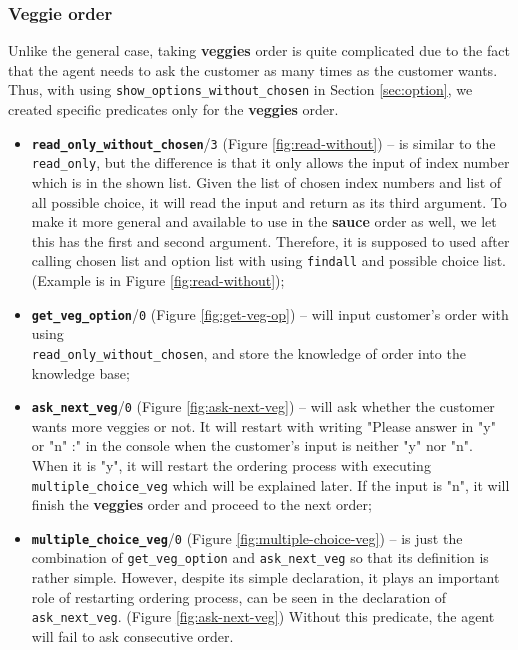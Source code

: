\documentclass[12pt,a4paper]{article}
\newcommand{\varname}[1]{\texttt{#1}}
\newcommand{\varnamebf}[1]{\textbf{\texttt{#1}}}
\newcommand{\predprot}[2]{{\color{MidnightBlue}\varnamebf{#1}}/{\color{Mulberry}\varname{#2}}}
\newcommand{\predname}[1]{{\color{MidnightBlue}\varname{#1}}}
\begin{document}
\subsubsection{Veggie order}
\label{sec:veg-order}

Unlike the general case, taking \textbf{veggies} order is quite complicated due to the fact that the agent needs to ask the customer as many times as the customer wants. Thus, with using \predname{show\_options\_without\_chosen} in Section \ref{sec:option}, we created specific predicates only for the \textbf{veggies} order. \\ 

\begin{itemize}
    \item \predprot{read\_only\_without\_chosen}{3} (Figure \ref{fig:read-without}) -- is similar to the \predname{read\_only}, but the difference is that it only allows the input of index number which is in the shown list. Given the list of chosen index numbers and list of all possible choice, it will read the input and return as its third argument. To make it more general and available to use in the \textbf{sauce} order as well, we let this has the first and second argument. Therefore, it is supposed to used after calling chosen list and option list with using \predname{findall} and possible choice list. (Example is in Figure \ref{fig:read-without});
    
    \item \predprot{get\_veg\_option}{0} (Figure \ref{fig:get-veg-op}) -- will input customer's order with using\\
    \predname{read\_only\_without\_chosen}, and store the knowledge of order into the knowledge base;
    
    \item \predprot{ask\_next\_veg}{0} (Figure \ref{fig:ask-next-veg}) -- will ask whether the customer wants more veggies or not. It will restart with writing "Please answer in "y" or "n" :" in the console when the customer's input is neither "y" nor "n". When it is "y", it will restart the ordering process with executing \predname{multiple\_choice\_veg} which will be explained later. If the input is "n", it will finish the \textbf{veggies} order and proceed to the next order;
    
    \item \predprot{multiple\_choice\_veg}{0} (Figure \ref{fig:multiple-choice-veg}) -- is just the combination of \predname{get\_veg\_option} and \predname{ask\_next\_veg} so that its definition is rather simple. However, despite its simple declaration, it plays an important role of restarting ordering process, can be seen in the declaration of \predname{ask\_next\_veg}. (Figure \ref{fig:ask-next-veg}) Without this predicate, the agent will fail to ask consecutive order.
\end{itemize}
\end{document}
